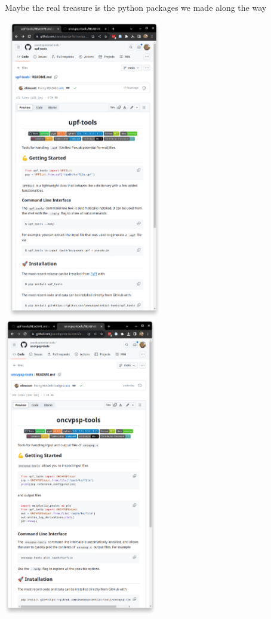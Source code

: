 \documentclass[xcolor=table,aspectratio=169]{beamer}
\numberwithin{equation}{section}
\begin{document}
\begin{frame}{\footnotesize Maybe the real treasure is the python packages we made along the way}

   \hbox{
    \includegraphics[width=0.5\textwidth]{figures/upf-tools.png}
    \includegraphics[width=0.5\textwidth]{figures/oncvpsp-tools.png}
   }
\end{frame}
\end{document}
